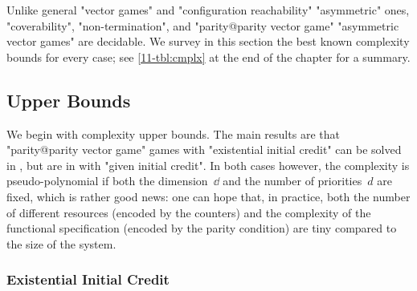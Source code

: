 Unlike general "vector games" and "configuration reachability"
"asymmetric" ones, "coverability", "non-termination", and
"parity@parity vector game" "asymmetric vector games" are decidable.
We survey in this section the best known complexity bounds for every
case; see \cref{11-tbl:cmplx} at the end of the chapter for a summary.

\subsection{Upper Bounds}
\label{11-subsec:up}
We begin with complexity upper bounds.  The main results are that
"parity@parity vector game" games with "existential initial credit"
can be solved in \coNP, but are in \kEXP[2] with "given initial
credit".  In both cases however, the complexity is pseudo-polynomial
if both the dimension~$\dd$ and the number of priorities~$d$ are
fixed, which is rather good news: one can hope that, in practice, both
the number of different resources (encoded by the counters) and the
complexity of the functional specification (encoded by the parity
condition) are tiny compared to the size of the system.

%
\subsubsection{Existential Initial Credit}
\label{11-subsec:up-exist}

